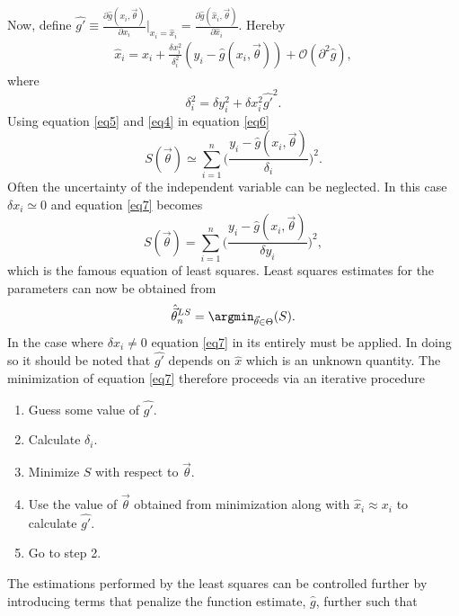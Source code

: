 Now, define $\hat{g'}\equiv \frac{\partial \hat{g}(x_i,\vec{\theta})}{\partial x_i}\bigg|_{x_i=\hat{x}_i}=\frac{\partial \hat{g}(\hat{x}_i,\vec{\theta})}{\partial \hat{x}_i}$. Hereby
\begin{equation}
	\begin{split}
		\hat{x}_i=x_i+\frac{\delta x_i^2}{\delta_i^2}(y_i-\hat{g}(x_i,\vec{\theta}))+\mathcal{O}(\partial^2\hat{g}),
	\end{split}
	\label{eq5}
\end{equation}
where
\begin{equation}
	\delta_i^2=\delta y_i^2+\delta x_i^2\hat{g'}^2.
\end{equation}
Using equation \eqref{eq5} and \eqref{eq4} in equation \eqref{eq6}
\begin{equation}
	S(\vec{\theta})\simeq\sum_{i=1}^n\bigg(\frac{y_i-\hat{g}(x_i,\vec{\theta})}{\delta_i}\bigg)^2.
	\label{eq7}
\end{equation}
Often the uncertainty of the independent variable can be neglected. In this case $\delta x_i\simeq 0$ and equation \eqref{eq7} becomes
\begin{equation}
	S(\vec{\theta})=\sum_{i=1}^n\bigg(\frac{y_i-\hat{g}(x_i,\vec{\theta})}{\delta y_i}\bigg)^2,
	\label{eq8}
\end{equation}
which is the famous equation of least squares. Least squares estimates for the parameters can now be obtained from
\begin{equation}
	\hat{\vec{ \theta}}_n^{LS}=\argmin_{\vec{\theta}\in \Theta}(S).
\end{equation}
In the case where $\delta x_i\neq 0$ equation \eqref{eq7} in its entirely must be applied. In doing so it should be noted that $\hat{g'}$ depends on $\hat{x}$ which is an unknown quantity. The minimization of equation \eqref{eq7} therefore proceeds via an iterative procedure
\begin{enumerate}
	\item Guess some value of $\hat{g'}$.
	\item Calculate $\delta_i$.
	\item Minimize $S$ with respect to $\vec{\theta}$.
	\item Use the value of $\vec{\theta}$ obtained from minimization along with $\hat{x}_i\approx x_i$ to calculate $\hat{g'}$.
	\item Go to step 2.\newline
\end{enumerate}
The estimations performed by the least squares can be controlled further by introducing terms that penalize the function estimate, $\hat{g}$, further such that
